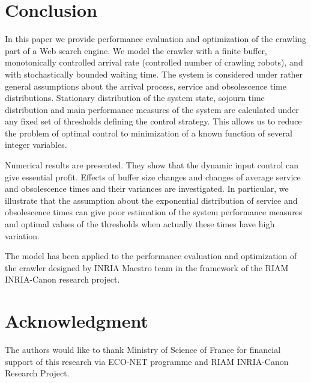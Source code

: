 \documentclass[11pt]{article}
\begin{document}
\section{Conclusion}

In this paper we provide performance evaluation and optimization
of the crawling part of a Web search engine. We model the crawler 
with a finite buffer, monotonically controlled arrival rate
(controlled number of crawling robots), and with stochastically 
bounded waiting time. The system is considered under rather general 
assumptions about the arrival process, service and obsolescence 
time distributions. Stationary distribution of the system state, 
sojourn time distribution and main performance measures of the system 
are calculated under any fixed set of thresholds defining the control 
strategy. This allows us to reduce the problem of optimal control 
to minimization of a known function of several integer variables.

Numerical results are presented. They show that the dynamic input
control can give essential profit. Effects of buffer size changes
and changes of average service and obsolescence times and their
variances are investigated. In particular, we illustrate that the
assumption about the exponential distribution of service and
obsolescence times can give poor estimation of the system performance 
measures and optimal values of the thresholds when actually these times 
have high variation.

The model has been applied to the performance evaluation and
optimization of the crawler designed by INRIA Maestro team in the framework
of the RIAM INRIA-Canon research project.


\section*{Acknowledgment}
The authors would like to thank Ministry of Science of France for
financial support of this research via ECO-NET programme and RIAM
INRIA-Canon Research Project.
\end{document}
